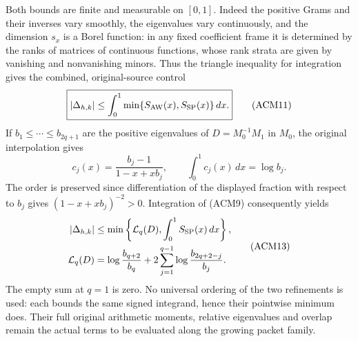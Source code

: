 Both bounds are finite and measurable on $[0,1]$. Indeed the positive
Grams and their inverses vary smoothly, the eigenvalues vary
continuously, and the dimension $s_x$ is a Borel function: in any
fixed coefficient frame it is determined by the ranks of matrices
of continuous functions, whose rank strata are given by vanishing
and nonvanishing minors. Thus the triangle inequality for integration
gives the combined, original-source control
\[
 \boxed{
 |\Delta_{h,k}|
 \le\int_0^1\min\{S_{\rm AW}(x),S_{\rm SP}(x)\}\,dx.}
 \tag{ACM11}
\]
If $b_1\le\cdots\le b_{2q+1}$ are the positive eigenvalues of
$D=M_0^{-1}M_1$ in $M_0$, the original interpolation gives
\[
 c_j(x)=\frac{b_j-1}{1-x+xb_j},\qquad
 \int_0^1c_j(x)\,dx=\log b_j.
 \tag{ACM12}
\]
The order is preserved since differentiation of the displayed
fraction with respect to $b_j$ gives $(1-x+xb_j)^{-2}>0$.
Integration of (ACM9) consequently yields
\[
 \begin{aligned}
 |\Delta_{h,k}|&\le
  \min\left\{\mathcal L_q(D),\int_0^1S_{\rm SP}(x)\,dx\right\},\\
 \mathcal L_q(D)&=\log\frac{b_{q+2}}{b_q}
       +2\sum_{j=1}^{q-1}\log\frac{b_{2q+2-j}}{b_j}.
 \end{aligned}
 \tag{ACM13}
\]
The empty sum at $q=1$ is zero. No universal ordering of the two
refinements is used: each bounds the same signed integrand, hence
their pointwise minimum does. Their full original arithmetic
moments, relative eigenvalues and overlap remain the actual terms
to be evaluated along the growing packet family.
